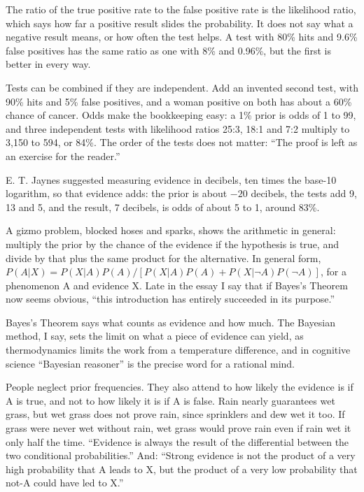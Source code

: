The ratio of the true positive rate to the false positive rate is the likelihood ratio, which says how far a positive result slides the probability. It does not say what a negative result means, or how often the test helps. A test with 80\% hits and 9.6\% false positives has the same ratio as one with 8\% and 0.96\%, but the first is better in every way.

Tests can be combined if they are independent. Add an invented second test, with 90\% hits and 5\% false positives, and a woman positive on both has about a 60\% chance of cancer. Odds make the bookkeeping easy: a 1\% prior is odds of 1 to 99, and three independent tests with likelihood ratios 25:3, 18:1 and 7:2 multiply to 3,150 to 594, or 84\%. The order of the tests does not matter: ``The proof is left as an exercise for the reader.''

E. T. Jaynes suggested measuring evidence in decibels, ten times the base-10 logarithm, so that evidence adds: the prior is about $-20$ decibels, the tests add 9, 13 and 5, and the result, 7 decibels, is odds of about 5 to 1, around 83\%.

A gizmo problem, blocked hoses and sparks, shows the arithmetic in general: multiply the prior by the chance of the evidence if the hypothesis is true, and divide by that plus the same product for the alternative. In general form, $P(A|X) = P(X|A)P(A) / [P(X|A)P(A) + P(X|\neg A)P(\neg A)]$, for a phenomenon A and evidence X. Late in the essay I say that if Bayes's Theorem now seems obvious, ``this introduction has entirely succeeded in its purpose.''

Bayes's Theorem says what counts as evidence and how much. The Bayesian method, I say, sets the limit on what a piece of evidence can yield, as thermodynamics limits the work from a temperature difference, and in cognitive science ``Bayesian reasoner'' is the precise word for a rational mind.

People neglect prior frequencies. They also attend to how likely the evidence is if A is true, and not to how likely it is if A is false. Rain nearly guarantees wet grass, but wet grass does not prove rain, since sprinklers and dew wet it too. If grass were never wet without rain, wet grass would prove rain even if rain wet it only half the time. ``Evidence is always the result of the differential between the two conditional probabilities.'' And: ``Strong evidence is not the product of a very high probability that A leads to X, but the product of a very low probability that not-A could have led to X.''

